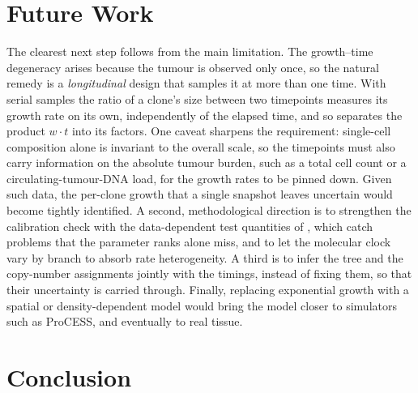 \section{Future Work}

The clearest next step follows from the main limitation. The growth--time degeneracy
arises because the tumour is observed only once, so the natural remedy is a
\emph{longitudinal} design that samples it at more than one time. With serial samples
the ratio of a clone's size between two timepoints measures its growth rate on its
own, independently of the elapsed time, and so separates the product $w\cdot t$ into
its factors. One caveat sharpens the requirement: single-cell composition alone is
invariant to the overall scale, so the timepoints must also carry information on the
absolute tumour burden, such as a total cell count or a circulating-tumour-DNA load,
for the growth rates to be pinned down. Given such data, the per-clone growth that a
single snapshot leaves uncertain would become tightly identified. A second, methodological direction is to strengthen the
calibration check with the data-dependent test quantities of
\textcite{modrak2023simulation}, which catch problems that the parameter ranks
alone miss, and to let the molecular clock vary by branch to absorb rate
heterogeneity. A third is to infer the tree and the copy-number assignments jointly
with the timings, instead of fixing them, so that their uncertainty is carried
through. Finally, replacing exponential growth with a spatial or density-dependent
model would bring the model closer to simulators such as ProCESS, and eventually to
real tissue.

\section{Conclusion}

